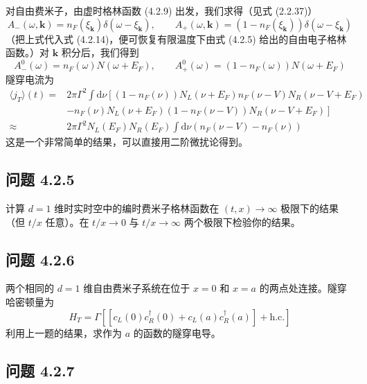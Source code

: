对自由费米子，由虚时格林函数 (4.2.9) 出发，我们求得（见式 (2.2.37)）
\begin{equation*}
A_{-}(\omega,\pmb{k}) = n_{F}(\xi_{\pmb{k}})\delta(\omega - \xi_{\pmb{k}}), \qquad A_{+}(\omega,\pmb{k}) = (1 - n_{F}(\xi_{\pmb{k}}))\delta(\omega - \xi_{\pmb{k}})
\end{equation*}
（把上式代入式 (4.2.14)，便可恢复有限温度下由式 (4.2.5) 给出的自由电子格林函数。）对 $\pmb{k}$ 积分后，我们得到
\begin{equation*}
A_{-}^{0}(\omega) = n_{F}(\omega)N(\omega + E_{F}), \qquad A_{+}^{0}(\omega) = (1 - n_{F}(\omega))N(\omega + E_{F}) \tag{4.2.18}
\end{equation*}
隧穿电流为
\begin{align*}
\langle j_{T}\rangle(t) = {}& 2\pi\Gamma^{2}\int \mathrm{d}\nu \left[(1 - n_{F}(\nu))N_{L}(\nu + E_{F})n_{F}(\nu - V)N_{R}(\nu - V + E_{F})\right.\\
&\left.- n_{F}(\nu)N_{L}(\nu + E_{F})(1 - n_{F}(\nu - V))N_{R}(\nu - V + E_{F})\right]\\
\approx {}& 2\pi\Gamma^{2}N_{L}(E_{F})N_{R}(E_{F})\int \mathrm{d}\nu\left(n_{F}(\nu - V) - n_{F}(\nu)\right)
\end{align*}
这是一个非常简单的结果，可以直接用二阶微扰论得到。

\subsection*{问题 4.2.5}

计算 $d = 1$ 维时实时空中的编时费米子格林函数在 $(t, x) \to \infty$ 极限下的结果（但 $t/x$ 任意）。在 $t/x \to 0$ 与 $t/x \to \infty$ 两个极限下检验你的结果。

\subsection*{问题 4.2.6}

两个相同的 $d = 1$ 维自由费米子系统在位于 $x = 0$ 和 $x = a$ 的两点处连接。隧穿哈密顿量为
\begin{equation*}
H_{T} = \Gamma\left[\left[c_{L}(0)c_{R}^{\dagger}(0) + c_{L}(a)c_{R}^{\dagger}(a)\right] + \text{h.c.}\right]
\end{equation*}
利用上一题的结果，求作为 $a$ 的函数的隧穿电导。

\subsection*{问题 4.2.7}

